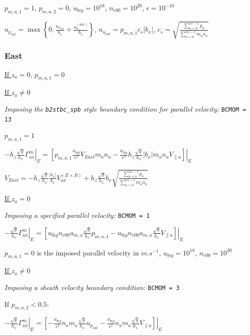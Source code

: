 \documentclass[a4paper,10pt]{report}
\begin{document}

$p_{m,a,1} = 1$, $p_{m,a,2} = 0$, $u_{big} = 10^{18}$, $n_{e00} = 10^{20}$, $\epsilon = 10^{-10}$

$u_{p_{out}} = \max \left\{ 0, \frac{u_{u_{out}}}{b_x} + \frac{u_a^{(dia)}}{b_x}  \right\}$,
$u_{u_{out}} = p_{m,a,1} c_s |b_x|$,
$c_s = \sqrt{\frac{\sum \limits_{a=0}^{ns-1} p_a}{\sum \limits_{a=0}^{ns-1} m_a n_a}}$

\subsubsection{East}

\underline{If $z_a = 0$}, $p_{m,a,1} = 0$

\underline{If $z_a \neq 0$}

{\em Imposing the {\tt b2stbc\_spb} style boundary condition for parallel velocity:} {\tt BCMOM = 13}

$p_{m,a,1} = 1$

$\left. -h_z \frac{\sqrt g}{h_x} \Gamma_{ax}^m \right|_E = \left. \left[
	p_{m,a,1} \frac{u_{big}}{\epsilon^2} V_{East} m_a n_a -
	\frac{u_{big}}{\epsilon^2} h_z \frac{\sqrt g}{h_x} |b_x| m_a n_a V_{\parallel a}
\right]
\right|_E$

$V_{East} =
- h_z \frac{\sqrt g}{h_x} \frac{|b_x|}{b_x} V_{ax}^{(E \times B)}
+ h_z \frac{\sqrt g}{h_x} b_x
\sqrt{\frac{\sum \limits_{a=0}^{ns-1} p_a}
{\sum \limits_{a=0}^{ns-1} m_a n_a}}$

\underline{If $z_a = 0$}

{\em Imposing a specified parallel velocity:} {\tt BCMOM = 1}

$\left. -\frac{\sqrt g}{h_x} \Gamma_{ax}^m \right|_E = \left. \left[
	u_{big} n_{e00} a_{m, a} \frac{\sqrt{g}}{h_x} p_{m,a,1} -
	u_{big} n_{e00} a_{m, a} \frac{\sqrt{g}}{h_x} V_{\parallel a}
\right]
\right|_E$

$p_{m,a,1}=0$ is the imposed parallel velocity in $m.s^{-1}$, $u_{big} = 10^{18}$, $n_{e00} = 10^{20}$

\underline{If $z_a \neq 0$}

{\em Imposing a sheath velocity boundary condition:} {\tt BCMOM = 3}

If $p_{m,a,2} < 0.5$:

$\left. -\frac{\sqrt g}{h_x} \Gamma_{ax}^m \right|_E = \left. \left[
	-\frac{u_{big}}{\epsilon^2}  n_a m_a \frac{\sqrt{g}}{h_x} u_{p_{out}}
	-\frac{u_{big}}{\epsilon^2}  n_a m_a \frac{\sqrt{g}}{h_x} V_{\parallel a}
\right]
\right|_E$
\end{document}
